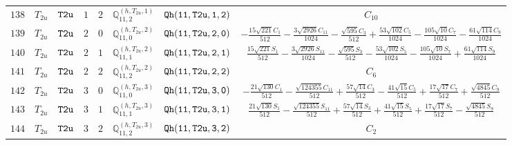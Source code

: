 \documentclass[fleqn,8pt]{jsarticle}
\begin{document}
\begin{table}[ht!]
\begin{center}
\begin{tabular}{cccccccc}
$ 138 $ & $ T_{2u} $ & $ {\tt T2u} $ & $ 1 $ & $ 2 $ & $ \mathbb{Q}_{11,2}^{(h,T_{2u},1)} $ & $ {\tt Qh(11,T2u,1,2)} $ & $ C_{10} $ \\
$ 139 $ & $ T_{2u} $ & $ {\tt T2u} $ & $ 2 $ & $ 0 $ & $ \mathbb{Q}_{11,0}^{(h,T_{2u},2)} $ & $ {\tt Qh(11,T2u,2,0)} $ & $ - \frac{15 \sqrt{221} C_{1}}{512} - \frac{3 \sqrt{2926} C_{11}}{1024} - \frac{\sqrt{595} C_{3}}{512} + \frac{53 \sqrt{102} C_{5}}{1024} - \frac{105 \sqrt{10} C_{7}}{1024} - \frac{61 \sqrt{114} C_{9}}{1024} $ \\
$ 140 $ & $ T_{2u} $ & $ {\tt T2u} $ & $ 2 $ & $ 1 $ & $ \mathbb{Q}_{11,1}^{(h,T_{2u},2)} $ & $ {\tt Qh(11,T2u,2,1)} $ & $ \frac{15 \sqrt{221} S_{1}}{512} - \frac{3 \sqrt{2926} S_{11}}{1024} - \frac{\sqrt{595} S_{3}}{512} - \frac{53 \sqrt{102} S_{5}}{1024} - \frac{105 \sqrt{10} S_{7}}{1024} + \frac{61 \sqrt{114} S_{9}}{1024} $ \\
$ 141 $ & $ T_{2u} $ & $ {\tt T2u} $ & $ 2 $ & $ 2 $ & $ \mathbb{Q}_{11,2}^{(h,T_{2u},2)} $ & $ {\tt Qh(11,T2u,2,2)} $ & $ C_{6} $ \\
$ 142 $ & $ T_{2u} $ & $ {\tt T2u} $ & $ 3 $ & $ 0 $ & $ \mathbb{Q}_{11,0}^{(h,T_{2u},3)} $ & $ {\tt Qh(11,T2u,3,0)} $ & $ - \frac{21 \sqrt{130} C_{1}}{512} - \frac{\sqrt{124355} C_{11}}{512} + \frac{57 \sqrt{14} C_{3}}{512} - \frac{41 \sqrt{15} C_{5}}{512} + \frac{17 \sqrt{17} C_{7}}{512} + \frac{\sqrt{4845} C_{9}}{512} $ \\
$ 143 $ & $ T_{2u} $ & $ {\tt T2u} $ & $ 3 $ & $ 1 $ & $ \mathbb{Q}_{11,1}^{(h,T_{2u},3)} $ & $ {\tt Qh(11,T2u,3,1)} $ & $ \frac{21 \sqrt{130} S_{1}}{512} - \frac{\sqrt{124355} S_{11}}{512} + \frac{57 \sqrt{14} S_{3}}{512} + \frac{41 \sqrt{15} S_{5}}{512} + \frac{17 \sqrt{17} S_{7}}{512} - \frac{\sqrt{4845} S_{9}}{512} $ \\
$ 144 $ & $ T_{2u} $ & $ {\tt T2u} $ & $ 3 $ & $ 2 $ & $ \mathbb{Q}_{11,2}^{(h,T_{2u},3)} $ & $ {\tt Qh(11,T2u,3,2)} $ & $ C_{2} $ \\
 \hline \hline
\end{tabular}
\end{center}
\end{table}
\end{document}
